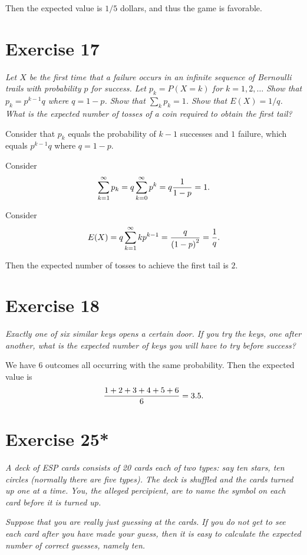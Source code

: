 \documentclass{abrice}
\begin{document}
Then the expected value is $1/5$ dollars, and thus the game is
favorable.

\section{Exercise 17}

\emph{Let $X$ be the first time that a \emph{failure} occurs in an
  infinite sequence of Bernoulli trails with probability $p$ for
  success. Let $p_k = P(X=k)$ for $k = 1,2,\dots$ Show that $p_k =
  p^{k-1} q$ where $q = 1 - p$. Show that $\sum_k p_k = 1$. Show that
  $E(X) = 1/q$. What is the expected number of tosses of a coin
  required to obtain the first tail?}

\bigskip

Consider that $p_k$ equals the probability of $k-1$ successes and $1$
failure, which equals $p^{k-1} q$ where $q = 1 - p$.

Consider
\[
\sum_{k=1}^{\infty} p_k = q \sum_{k=0}^{\infty} p^k = q {1 \over 1 -
  p} = 1.
\]

Consider
\[
E(X) = q \sum_{k=1}^{\infty} k p^{k - 1} = {q \over {(1 - p)}^2} = {1
  \over q}.
\]

Then the expected number of tosses to achieve the first tail is $2$.

\section{Exercise 18}

\emph{Exactly one of six similar keys opens a certain door. If you try
the keys, one after another, what is the expected number of keys you
will have to try before success?}

\bigskip

We have $6$ outcomes all occurring with the same probability. Then the
expected value is
\[
{1 + 2 + 3 + 4 + 5 + 6 \over 6} = 3.5.
\]

\section{Exercise 25*}

\emph{A deck of ESP cards consists of 20 cards each of two types: say
  ten stars, ten circles (normally there are five types).  The deck is
  shuffled and the cards turned up one at a time.  You, the alleged
  percipient, are to name the symbol on each card \emph{before} it is
  turned up.}

\emph{Suppose that you are really just guessing at the cards.  If you
  do not get to see each card after you have made your guess, then it
  is easy to calculate the expected number of correct guesses, namely
  ten.}
\end{document}
